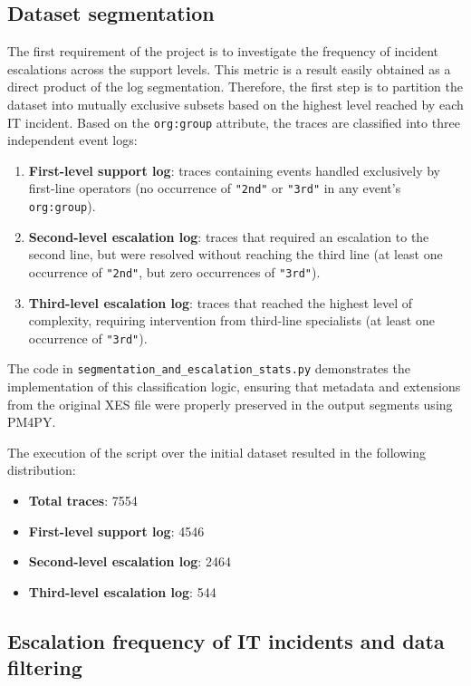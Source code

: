 \documentclass[11pt,a4paper]{article}
\begin{document}
\subsection{Dataset segmentation}
The first requirement of the project is to investigate the frequency of incident escalations across the support levels. This metric is a result easily obtained as a direct product of the log segmentation. Therefore, the first step is to partition the dataset into mutually exclusive subsets based on the highest level reached by each IT incident. Based on the \texttt{org:group} attribute, the traces are classified into three independent event logs:
\begin{enumerate}
    \item \textbf{First-level support log}: traces containing events handled exclusively by first-line operators (no occurrence of \texttt{"2nd"} or \texttt{"3rd"} in any event's \texttt{org:group}).
    \item \textbf{Second-level escalation log}: traces that required an escalation to the second line, but were resolved without reaching the third line (at least one occurrence of \texttt{"2nd"}, but zero occurrences of \texttt{"3rd"}).
    \item \textbf{Third-level escalation log}: traces that reached the highest level of complexity, requiring intervention from third-line specialists (at least one occurrence of \texttt{"3rd"}).
\end{enumerate}

The code in \texttt{segmentation\_and\_escalation\_stats.py} demonstrates the implementation of this classification logic, ensuring that metadata and extensions from the original XES file were properly preserved in the output segments using PM4PY.

The execution of the script over the initial dataset resulted in the following distribution:

\begin{itemize}
    \item \textbf{Total traces}: 7554
    \item \textbf{First-level support log}: 4546
    \item \textbf{Second-level escalation log}: 2464
    \item \textbf{Third-level escalation log}: 544
\end{itemize}

\subsection{Escalation frequency of IT incidents and data filtering}
\end{document}
